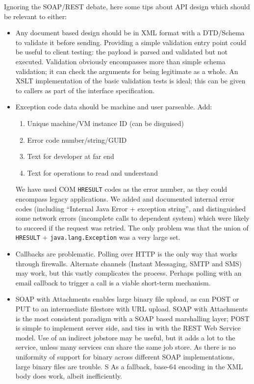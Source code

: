 \documentclass[draft]{report}
\begin{document}
Ignoring the SOAP/REST debate, here some tips about API design which
should be relevant to either:

\begin{itemize}

\item Any document based design should be in XML format with a
DTD/Schema to validate it before sending. Providing a simple validation
entry point could be useful to client testing: the payload is parsed and
validated but not executed. Validation obviously encompasses more than
simple schema validation; it can check the arguments for being
legitimate as a whole. An XSLT implementation of the basic validation
tests is ideal; this can be given to callers as part of the interface
specification.

\item Exception code data should be machine and user parseable. Add:

\begin{enumerate}

\item Unique machine/VM instance ID (can be disguised)

\item Error code number/string/GUID

\item Text for developer at far end

\item Text for operations to read and understand

\end{enumerate}

We have used COM \verb$HRESULT$ codes as the error number, as they could
encompass legacy applications. We added and documented internal error
codes (including ``Internal Java Error + exception string'', and
distinguished some network errors (incomplete calls to dependent system)
which were likely to succeed if the request was retried. The only
problem was that the union of \verb$HRESULT$ +
\verb$java.lang.Exception$ was a very large set.

\item Callbacks are problematic. Polling over HTTP is the only way that
works through firewalls. Alternate channels (Instant Messaging, SMTP and
SMS) may work, but this vastly complicates the process. Perhaps polling
with an email callback to trigger a call is a viable short-term
mechanism.

\item SOAP with Attachments enables large binary file upload, as can
POST or PUT to an intermediate filestore with URL upload. SOAP with
Attachments is the most consistent paradigm with a SOAP based
marshalling layer; POST is simple to implement server side, and ties in
with the REST Web Service model. Use of an indirect jobstore may be
useful, but it adds a lot to the service, unless many services can share
the same job store. As there is no uniformity of support for binary
across different SOAP implementations, large binary files are trouble. S
As a fallback, base-64 encoding in the XML body does work, albeit
inefficiently.


\end{itemize}
\end{document}

